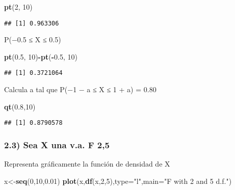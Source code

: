 \documentclass[
]{article}
\newenvironment{Shaded}{\begin{snugshade}}{\end{snugshade}}
\newcommand{\DataTypeTok}[1]{\textcolor[rgb]{0.13,0.29,0.53}{#1}}
\newcommand{\DecValTok}[1]{\textcolor[rgb]{0.00,0.00,0.81}{#1}}
\newcommand{\FloatTok}[1]{\textcolor[rgb]{0.00,0.00,0.81}{#1}}
\newcommand{\KeywordTok}[1]{\textcolor[rgb]{0.13,0.29,0.53}{\textbf{#1}}}
\newcommand{\NormalTok}[1]{#1}
\newcommand{\OperatorTok}[1]{\textcolor[rgb]{0.81,0.36,0.00}{\textbf{#1}}}
\newcommand{\StringTok}[1]{\textcolor[rgb]{0.31,0.60,0.02}{#1}}
\begin{document}
\begin{Shaded}
\begin{Highlighting}[]
\KeywordTok{pt}\NormalTok{(}\DecValTok{2}\NormalTok{, }\DecValTok{10}\NormalTok{)}
\end{Highlighting}
\end{Shaded}

\begin{verbatim}
## [1] 0.963306
\end{verbatim}

P(−0.5 ≤ X ≤ 0.5)

\begin{Shaded}
\begin{Highlighting}[]
\KeywordTok{pt}\NormalTok{(}\FloatTok{0.5}\NormalTok{, }\DecValTok{10}\NormalTok{)}\OperatorTok{-}\KeywordTok{pt}\NormalTok{(}\OperatorTok{-}\FloatTok{0.5}\NormalTok{, }\DecValTok{10}\NormalTok{)}
\end{Highlighting}
\end{Shaded}

\begin{verbatim}
## [1] 0.3721064
\end{verbatim}

Calcula a tal que P(−1 − a ≤ X ≤ 1 + a) = 0.80

\begin{Shaded}
\begin{Highlighting}[]
\KeywordTok{qt}\NormalTok{(}\FloatTok{0.8}\NormalTok{,}\DecValTok{10}\NormalTok{)}
\end{Highlighting}
\end{Shaded}

\begin{verbatim}
## [1] 0.8790578
\end{verbatim}

\hypertarget{sea-x-una-v.a.-f-25}{%
\subsubsection{2.3) Sea X una v.a. F 2,5}\label{sea-x-una-v.a.-f-25}}

Representa gráficamente la función de densidad de X

\begin{Shaded}
\begin{Highlighting}[]
\NormalTok{x<-}\KeywordTok{seq}\NormalTok{(}\DecValTok{0}\NormalTok{,}\DecValTok{10}\NormalTok{,}\FloatTok{0.01}\NormalTok{)}
\KeywordTok{plot}\NormalTok{(x,}\KeywordTok{df}\NormalTok{(x,}\DecValTok{2}\NormalTok{,}\DecValTok{5}\NormalTok{),}\DataTypeTok{type=}\StringTok{"l"}\NormalTok{,}\DataTypeTok{main=}\StringTok{"F with 2 and 5 d.f."}\NormalTok{)}
\end{Highlighting}
\end{Shaded}
\end{document}
